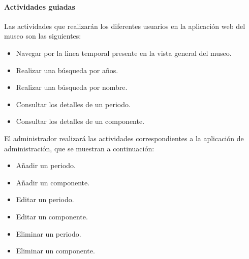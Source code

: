 \paragraph*{Actividades guiadas}
Las actividades que realizarán los diferentes usuarios en la aplicación web del museo son las siguientes:
\begin{itemize}
\item Navegar por la linea temporal presente en la vista general del museo.
\item Realizar una búsqueda por años.
\item Realizar una búsqueda por nombre.
\item Consultar los detalles de un periodo.
\item Consultar los detalles de un componente.
\end{itemize}
El administrador realizará las actividades correspondientes a la aplicación de administración, que se muestran a continuación:
\begin{itemize}
\item Añadir un periodo.
\item Añadir un componente.
\item Editar un periodo.
\item Editar un componente.
\item Eliminar un periodo.
\item Eliminar un componente.
\end{itemize}

